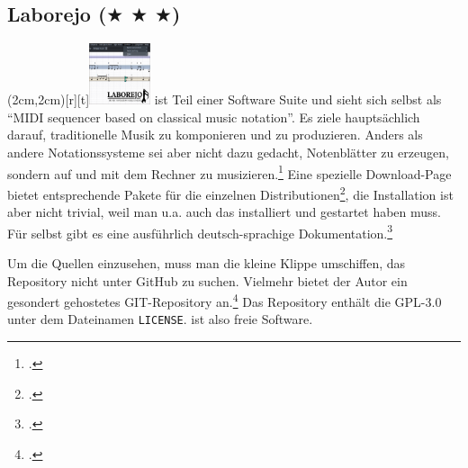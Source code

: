 %
%
%



\subsection{Laborejo ($\bigstar$ $\bigstar$ $\bigstar$)}

\parpic(2cm,2cm)[r][t]{\includegraphics[width=1.8cm]{logos/laborejo-300dpi.png}}
\label{Laborejo} ist Teil einer Software Suite und sieht sich
selbst als \enquote{MIDI sequencer based on classical music notation}. Es ziele
hauptsächlich darauf, traditionelle Musik zu komponieren und zu produzieren.
Anders als andere Notationssysteme sei  aber nicht dazu gedacht,
Notenblätter zu erzeugen, sondern auf und mit dem Rechner zu musizieren.\footcite[vgl.][\nopage wp.]{Hilbricht2019a} Eine spezielle Download-Page bietet entsprechende Pakete für die einzelnen Distributionen\footcite[vgl.][\nopage wp.]{Hilbricht2019b}, die Installation ist aber nicht trivial, weil man u.a. auch das  installiert und gestartet haben muss. Für  selbst gibt es eine ausführlich deutsch-sprachige Dokumentation.\footcite[vgl.][\nopage wp.]{Hilbricht2019c}

Um die Quellen einzusehen, muss man die kleine Klippe umschiffen, das Repository nicht unter GitHub zu suchen. Vielmehr bietet der Autor ein gesondert gehostetes GIT-Repository an.\footcite[vgl.][\nopage wp.]{Hilbricht2021a} Das Repository enthält die GPL-3.0 unter dem Dateinamen \texttt{LICENSE}.  ist also freie Software.

